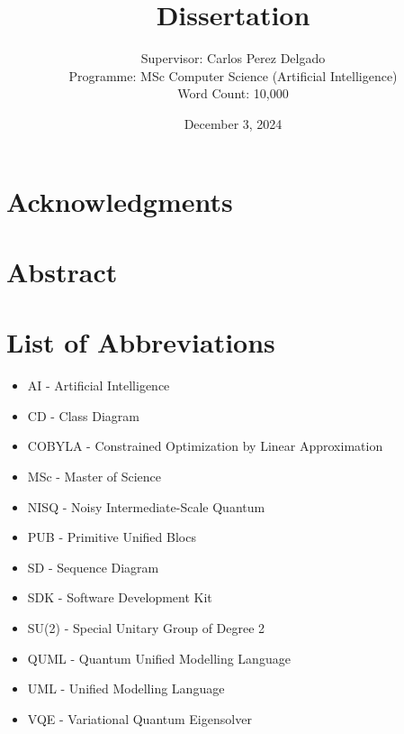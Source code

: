 \documentclass{article}
\title{Dissertation}
\author{Supervisor: Carlos Perez Delgado\\ Programme: MSc Computer Science (Artificial Intelligence) \\ Word Count: 10,000}
\date{December 3, 2024}
\begin{document}
\maketitle

\thispagestyle{empty} %

\newpage
\setcounter{page}{1}

\section*{Acknowledgments}
\newpage

\section*{Abstract}
\newpage

\listoffigures
\newpage

\listoftables
\newpage

\section*{List of Abbreviations}
\begin{itemize}
    \item AI - Artificial Intelligence
    \item CD - Class Diagram
    \item COBYLA - Constrained Optimization by Linear Approximation
    \item MSc - Master of Science
    \item NISQ - Noisy Intermediate-Scale Quantum
    \item PUB - Primitive Unified Blocs
    \item SD - Sequence Diagram
    \item SDK - Software Development Kit
    \item SU(2) - Special Unitary Group of Degree 2
    \item QUML - Quantum Unified Modelling Language
    \item UML - Unified Modelling Language
    \item VQE - Variational Quantum Eigensolver
\end{itemize}
\newpage

\tableofcontents
\end{document}
